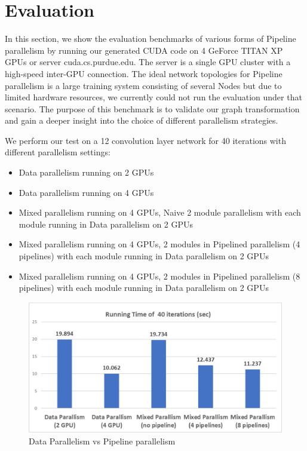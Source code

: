 \documentclass[sigplan]{acmart}\settopmatter{printfolios=true,printccs=false,printacmref=false}
\begin{document}
 \section{Evaluation}\label{evaluation}
 In this section, we show the evaluation benchmarks of various forms of Pipeline parallelism by running our generated CUDA code on 4 GeForce TITAN XP GPUs or server cuda.cs.purdue.edu. The server is a single GPU cluster with a high-speed inter-GPU connection. The ideal network topologies for Pipeline parallelism is a large training system consisting of several Nodes but due to limited hardware resources, we currently could not run the evaluation under that scenario. The purpose of this benchmark is to validate our graph transformation and gain a deeper insight into the choice of different parallelism strategies.\par
 We perform our test on a 12 convolution layer network for 40 iterations with different parallelism settings:
 \begin{itemize}
   \item Data parallelism running on 2 GPUs
   \item Data parallelism running on 4 GPUs
   \item Mixed parallelism running on 4 GPUs, Naive 2 module parallelism with each module running in Data parallelism on 2 GPUs
   \item Mixed parallelism running on 4 GPUs, 2 modules in Pipelined parallelism (4 pipelines) with each module running in Data parallelism on 2 GPUs
   \item Mixed parallelism running on 4 GPUs, 2 modules in Pipelined parallelism (8 pipelines) with each module running in Data parallelism on 2 GPUs
 \end{itemize}
 \begin{figure}[htbp]
  \centering
  \includegraphics[scale=0.5]{pipelineparallelruntime.png}
  \caption{Data Parallelism vs Pipeline parallelism}
  \label{fig:runtime}
\end{figure}
\end{document}

